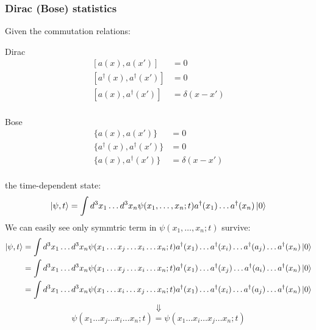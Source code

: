 \subsubsection{Dirac (Bose) statistics}
Given the commutation relations:

\begin{minipage}{0.5\linewidth}
    \centering
    Dirac
    \begin{equation*}
	\begin{aligned}
	    [a(x), a(x')] &= 0	\\
	    [a^\dag(x), a^\dag(x')] &= 0	\\
	    [a(x), a^\dag(x')] &= \delta(x-x')	\\
	\end{aligned}
    \end{equation*}
\end{minipage}
\begin{minipage}{0.5\linewidth}
    \centering
    Bose
    \begin{equation*}
	\begin{aligned}
	    \{a(x), a(x')\} &= 0 \\
	    \{a^\dag(x), a^\dag(x')\} &= 0  \\
	    \{a(x), a^\dag(x')\} &= \delta(x-x')    \\
	\end{aligned}
    \end{equation*}
\end{minipage}
the time-dependent state:
$$ \ket{\psi, t} = \int d^3x_1\dots d^3x_n \psi(x_1, \dots, x_n; t) 
    a^\dag(x_1) \dots a^\dag(x_n) \ket{0} $$
We can easily see only symmtric term in $\psi(x_1, \dots, x_n; t)$ survive:
\begin{equation*}
    \begin{aligned}
	\ket{\psi, t} &= \int d^3x_1\dots d^3x_n \psi(x_1 \dots x_j \dots x_i \dots x_n; t) 
	a^\dag(x_1) \dots a^\dag(x_i) \dots a^\dag(a_j) \dots a^\dag(x_n) \ket{0} \\
	&= \int d^3x_1\dots d^3x_n \psi(x_1 \dots x_j \dots x_i \dots x_n; t) 
	a^\dag(x_1) \dots a^\dag(x_j) \dots a^\dag(a_i) \dots a^\dag(x_n) \ket{0}   \\
	&= \int d^3x_1\dots d^3x_n \psi(x_1 \dots x_i \dots x_j \dots x_n; t) 
	a^\dag(x_1) \dots a^\dag(x_i) \dots a^\dag(a_j) \dots a^\dag(x_n) \ket{0}   \\
    \end{aligned}
\end{equation*}
$$ \Downarrow $$
$$\psi(x_1 \dots x_j \dots x_i \dots x_n; t) = \psi(x_1 \dots x_i \dots x_j \dots x_n; t) $$


